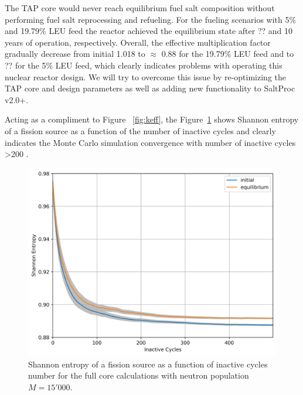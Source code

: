 \documentclass[12pt]{article} %
\begin{document}
The \gls{TAP} core would never reach equilibrium fuel salt composition without 
performing fuel salt reprocessing and refueling. For the fueling scenarios with 
5\% and 19.79\% \gls{LEU} feed the reactor achieved the equilibrium state after 
?? and 10 years of operation, respectively. Overall, the effective multiplication 
factor gradually decrease from initial 1.018 to $\approx$ 0.88 for the 19.79\% 
\gls{LEU} feed and to ?? for the 5\% \gls{LEU} feed, which clearly indicates 
problems with operating this nuclear reactor design. We will try to overcome 
this issue by re-optimizing the \gls{TAP} core and design parameters as well as 
adding new functionality to SaltProc v2.0+.

Acting as a compliment to Figure ~\ref{fig:keff}, the Figure~\ref{fig:shannon} 
shows Shannon entropy of a fission source as a function of the number of inactive 
cycles and clearly indicates the Monte Carlo simulation convergence with number 
of inactive cycles >200 \cite{brown_k-effective_2011-1}. 
\begin{figure}[htp!] %
  \centering
		  \includegraphics[width=\textwidth]{h_src.png}
	 \vspace{-0.35in}
  \caption{Shannon entropy of a fission source as a function of inactive cycles number 
  for the full core calculations with neutron population $M=15'000$.}
  \label{fig:shannon}
\end{figure}
\end{document}
